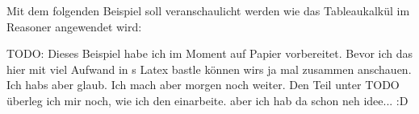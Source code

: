 Mit dem folgenden Beispiel soll veranschaulicht werden wie das Tableaukalkül im Reasoner angewendet wird:

TODO: Dieses Beispiel habe ich im Moment auf Papier vorbereitet. Bevor ich das hier mit viel Aufwand in s Latex bastle können wirs ja mal zusammen anschauen. Ich habs aber glaub. Ich mach aber morgen noch weiter. Den Teil unter TODO überleg ich mir noch, wie ich den einarbeite. aber ich hab da schon neh idee... :D


%
%
%
%
%
%
%
%
